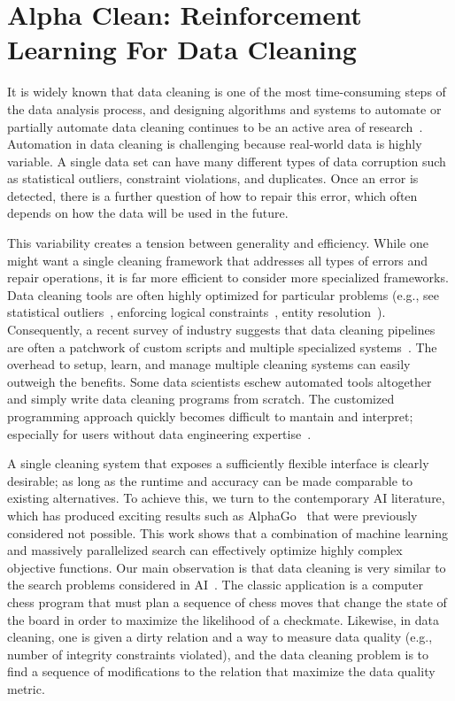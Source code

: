\chapter{Alpha Clean: Reinforcement Learning For Data Cleaning}
It is widely known that data cleaning is one of the most time-consuming steps of the data analysis process, and
designing algorithms and systems to automate or partially automate data cleaning continues to be an active area of research~\cite{DBLP:conf/sigmod/ChuIKW16}.
Automation in data cleaning is challenging because real-world data is highly variable. 
A single data set can have many different types of data corruption such as statistical outliers, constraint violations, and duplicates.
Once an error is detected, there is a further question of how to repair this error, which often depends on how the data will be used in the future.

This variability creates a tension between generality and efficiency.
While one might want a single cleaning framework that addresses all types of errors and repair operations, it is far more efficient to consider more specialized frameworks.
Data cleaning tools are often highly optimized for particular problems  (e.g., see statistical outliers~\cite{hellerstein2008quantitative}, enforcing logical constraints~\cite{DBLP:conf/sigmod/ChuIKW16}, entity resolution~\cite{DBLP:journals/pvldb/KopckeTR10}). 
Consequently, a recent survey of industry suggests that data cleaning pipelines are often a patchwork of custom scripts and multiple specialized systems~\cite{krishnan2016hilda}.
The overhead to setup, learn, and manage multiple cleaning systems can easily outweigh the benefits.
Some data scientists eschew automated tools altogether and simply write data cleaning programs from scratch.
The customized programming approach quickly becomes difficult to mantain and interpret; especially for users without data engineering expertise~\cite{sculley2014machine}.

A single cleaning system that exposes a sufficiently flexible interface is clearly desirable; as long as the runtime and accuracy can be made comparable to existing alternatives.  
To achieve this, we turn to the contemporary AI literature, which has produced exciting results such as AlphaGo~\cite{silver2016mastering} that were previously considered not possible.    This work shows that a combination of machine learning and massively parallelized search can effectively optimize highly complex objective functions.
Our main observation is that data cleaning is very similar to the search problems considered in AI~\cite{russell1995modern}.
The classic application is a computer chess program that must plan a sequence of chess moves that change the state of the board in order to maximize the likelihood of a checkmate. Likewise, in data cleaning, one is given a dirty relation and a way to measure data quality (e.g., number of integrity constraints violated), and the data cleaning problem is to find a sequence of modifications to the relation that maximize the data quality metric.

